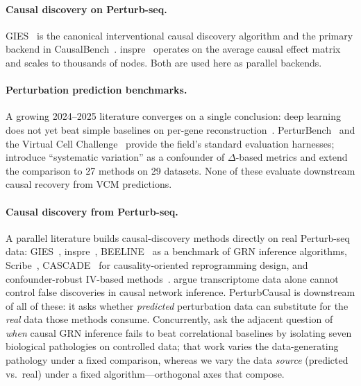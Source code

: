 \documentclass{article}
\theoremstyle{plain}
\theoremstyle{definition}
\theoremstyle{remark}
\begin{document}
\paragraph{Causal discovery on Perturb-seq.} GIES~\citep{hauser2012gies} is the canonical interventional causal discovery algorithm and the primary backend in CausalBench~\citep{chevalley2025causalbench}. inspre~\citep{brown2025inspre} operates on the average causal effect matrix and scales to thousands of nodes. Both are used here as parallel backends.

\paragraph{Perturbation prediction benchmarks.} A growing 2024--2025 literature converges on a single conclusion: deep learning does not yet beat simple baselines on per-gene reconstruction~\citep{ahlmanneltze2025,wong2025simple,csendes2025benchmark,wei2025benchmark,vinas2025systema,bendidi2024pca,wenteler2025perteval,zhu2025garm,li2025systematic,mejia2025diversity}. PerturBench~\citep{wu2024perturbench} and the Virtual Cell Challenge~\citep{roohani2025vcc} provide the field's standard evaluation harnesses; \citet{vinas2025systema} introduce ``systematic variation'' as a confounder of $\Delta$-based metrics and \citet{wei2025benchmark} extend the comparison to 27 methods on 29 datasets. None of these evaluate downstream causal recovery from VCM predictions.

\paragraph{Causal discovery from {Perturb-seq}.} A parallel literature builds causal-discovery methods directly on real Perturb-seq data: GIES~\citep{hauser2012gies}, inspre~\citep{brown2025inspre}, BEELINE~\citep{pratapa2019beeline} as a benchmark of GRN inference algorithms, Scribe~\citep{qiu2020scribe}, CASCADE~\citep{cao2025cascade} for causality-oriented reprogramming design, and confounder-robust IV-based methods~\citep{park2026confounder}. \citet{kernfeld2024fdr} argue transcriptome data alone cannot control false discoveries in causal network inference. {PerturbCausal} is downstream of all of these: it asks whether \emph{predicted} perturbation data can substitute for the \emph{real} data those methods consume. Concurrently, \citet{fernandez2026grnbreak} ask the adjacent question of \emph{when} causal GRN inference fails to beat correlational baselines by isolating seven biological pathologies on controlled data; that work varies the data-generating pathology under a fixed comparison, whereas we vary the data \emph{source} (predicted vs.\ real) under a fixed algorithm---orthogonal axes that compose.
\end{document}
